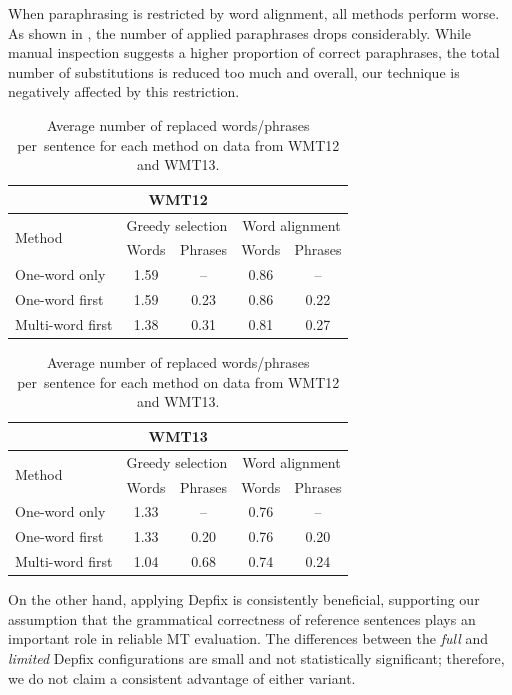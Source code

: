 When paraphrasing is restricted by word alignment, all methods perform worse. As shown in , the number of applied paraphrases drops considerably. While manual inspection suggests a higher proportion of correct paraphrases, the total number of substitutions is reduced too much and overall, our technique is negatively affected by this restriction.

\begin{table}[tb!]
\centering

\begin{tabular}{lcccc} 
\multicolumn{5}{c}{\textbf{WMT12}}\\
\toprule
\multirow{2}{*}{Method} & \multicolumn{2}{c}{Greedy selection} & \multicolumn{2}{c}{Word alignment} \\
\cmidrule(lr){2-3} \cmidrule(lr){4-5}
& Words & Phrases & Words & Phrases \\
\midrule
One-word only     & 1.59 & --   & 0.86 &  --  \\
One-word first    & 1.59 & 0.23 & 0.86 & 0.22 \\
Multi-word first  & 1.38 & 0.31 & 0.81 & 0.27 \\
\bottomrule
\end{tabular}

\vspace{10pt} 

\begin{tabular}{lcccc}
\multicolumn{5}{c}{\textbf{WMT13}}\\
\toprule
\multirow{2}{*}{Method} & \multicolumn{2}{c}{Greedy selection} & \multicolumn{2}{c}{Word alignment} \\
\cmidrule(lr){2-3} \cmidrule(lr){4-5}
& Words & Phrases & Words & Phrases \\
\midrule
One-word only    & 1.33 &  --   & 0.76 & --   \\
One-word first   & 1.33 & 0.20 & 0.76 & 0.20 \\
Multi-word first & 1.04 & 0.68 & 0.74 & 0.24 \\
\bottomrule
\end{tabular}

\caption{Average number of replaced words/phrases per~sentence for each method 
on data from WMT12 and WMT13.}
\label{substitutions:12:13}
\end{table}

 

On the other hand, applying Depfix is consistently beneficial, supporting our assumption that the grammatical correctness of reference sentences plays an important role in reliable MT evaluation. The differences between the \emph{full} and \emph{limited} Depfix configurations are small and not statistically significant; therefore, we do not claim a consistent advantage of either variant.

